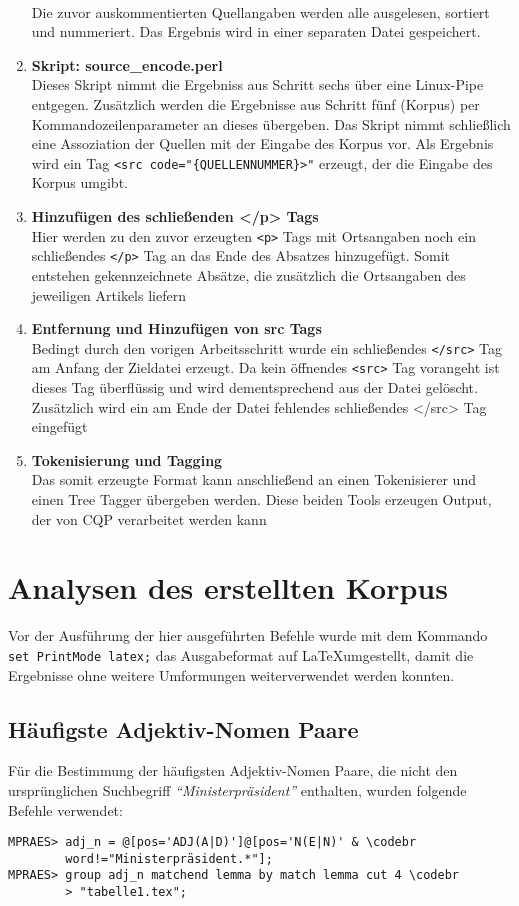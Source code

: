 \documentclass[%
	type=document,%
  	style=article,%
  	media=print,
  	pages=oneside,%
  	prefixLecturer=Dozenten:,
  	author=multiple,
]{unihildesheim} %
\newcommand{\codebr}{\textbf{\rotatebox[origin=c]{180}{$\Rsh$}}}
\begin{document}
\begin{enumerate}
  \\ Die zuvor auskommentierten Quellangaben werden alle ausgelesen, sortiert
  und nummeriert. Das Ergebnis wird in einer separaten Datei gespeichert.
  \item \textbf{Skript: source\_encode.perl}
  \\Dieses Skript nimmt die Ergebniss aus Schritt sechs über eine Linux-Pipe
  entgegen. Zusätzlich werden die Ergebnisse aus Schritt fünf (Korpus) per
  Kommandozeilenparameter an dieses übergeben. Das Skript nimmt schließlich eine
  Assoziation der Quellen mit der Eingabe des Korpus vor. Als Ergebnis wird ein
  Tag \texttt{<src code="\{QUELLENNUMMER\}>"} erzeugt, der die Eingabe des
  Korpus umgibt.
  \item \textbf{Hinzufügen des schließenden </p> Tags}
  \\ Hier werden zu den zuvor erzeugten \texttt{<p>} Tags mit Ortsangaben noch
  ein schließendes \texttt{</p>} Tag an das Ende des Absatzes hinzugefügt. Somit
  entstehen gekennzeichnete Absätze, die zusätzlich die Ortsangaben des jeweiligen
  Artikels liefern
  \item \textbf{Entfernung und Hinzufügen von src Tags}
  \\ Bedingt durch den vorigen Arbeitsschritt wurde ein schließendes
  \texttt{</src>} Tag am Anfang der Zieldatei erzeugt. Da kein öffnendes
  \texttt{<src>} Tag vorangeht ist dieses Tag überflüssig und wird
  dementsprechend aus der Datei gelöscht.
  Zusätzlich wird ein am Ende der Datei fehlendes schließendes </src> Tag
  eingefügt
  \item \textbf{Tokenisierung und Tagging}
  \\ Das somit erzeugte Format kann anschließend an einen Tokenisierer und einen
  Tree Tagger übergeben werden. Diese beiden Tools erzeugen Output, der von CQP
  verarbeitet werden kann
\end{enumerate}

\section{Analysen des erstellten Korpus}

Vor der Ausführung der hier ausgeführten Befehle wurde mit dem Kommando
\texttt{set PrintMode latex;} das Ausgabeformat auf \LaTeX umgestellt, damit die
Ergebnisse ohne weitere Umformungen weiterverwendet werden konnten.


\subsection{Häufigste Adjektiv-Nomen Paare}
Für die Bestimmung der häufigsten Adjektiv-Nomen Paare, die nicht den
ursprünglichen Suchbegriff \textit{"`Ministerpräsident"'} enthalten, wurden
folgende Befehle verwendet:
\begin{Verbatim}[frame=single,label=CQP,commandchars=\\\{\}]
MPRAES> adj_n = @[pos='ADJ(A|D)']@[pos='N(E|N)' & \codebr
        word!="Ministerpräsident.*"];
MPRAES> group adj_n matchend lemma by match lemma cut 4 \codebr
        > "tabelle1.tex";
\end{Verbatim}
\end{document}
